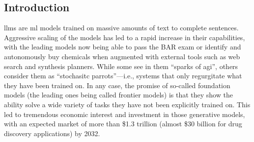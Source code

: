 \documentclass[11pt, oneside]{article}
\begin{document}
\clearpage
\begin{refsection}
\section{Introduction}
\Glspl{llm} are \gls{ml} models trained on massive amounts of text to complete sentences. 
Aggressive scaling of the models has led to a rapid increase in their capabilities,\autocite{brown2020language,zhong2024benchmarking} with the leading models now being able to pass the BAR exam or identify and autonomously buy chemicals when augmented with external tools such as web search and synthesis planners.\autocite{openai2024gpt4}
While some see in them \enquote{sparks of \gls{agi}},\autocite{bubeck2023sparks} others consider them as \enquote{stochasitc parrots}---i.e., systems that only regurgitate what they have been trained on.\autocite{bender2021dangers}
In any case, the promise of so-called foundation models (the leading ones being called frontier models) is that they show the ability solve a wide variety of tasks they have not been explicitly trained on.\autocite{bommasani2021opportunities, anderljung2023frontier}
This led to tremendous economic interest and investment in those generative models, with an expected market of more than \$1.3 trillion (almost \$30 billion for drug discovery applications) by 2032.\autocite{bloomberg}


\end{refsection}
\end{document}
